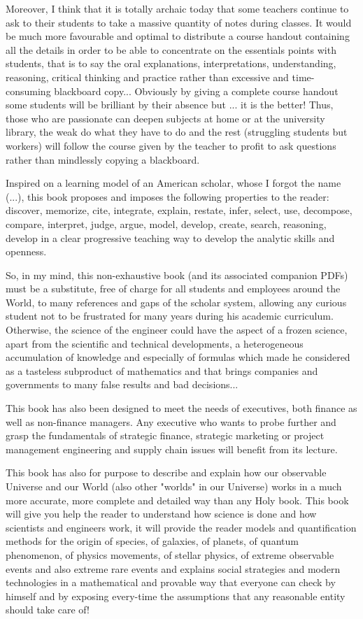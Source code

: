 	Moreover, I think that it is totally archaic today that some teachers continue to ask to their students to take a massive quantity of notes during classes. It would be much more favourable and optimal to distribute a course handout containing all the details in order to be able to concentrate on the essentials points with students, that is to say the oral explanations, interpretations, understanding, reasoning, critical thinking and practice rather than excessive and time-consuming blackboard copy... Obviously by giving a complete course handout some students will be brilliant by their absence but ... it is the better! Thus, those who are passionate can deepen subjects at home or at the university library, the weak do what they have to do and the rest (struggling students but workers) will follow the course given by the teacher to profit to ask questions rather than mindlessly copying a blackboard.

	Inspired on a learning model of an American scholar, whose I forgot the name (...), this book proposes and imposes the following properties to the reader: discover, memorize, cite, integrate, explain, restate, infer, select, use, decompose, compare, interpret, judge, argue, model, develop, create, search, reasoning, develop in a clear progressive teaching way to develop the analytic skills and openness.

	So, in my mind, this non-exhaustive book (and its associated companion PDFs) must be a substitute, free of charge for all students and employees around the World, to many references and gaps of the scholar system, allowing any curious student not to be frustrated for many years during his academic curriculum. Otherwise, the science of the engineer could have the aspect of a frozen science, apart from the scientific and technical developments, a heterogeneous accumulation of knowledge and especially of formulas which made he considered as a tasteless subproduct of mathematics and that brings companies and governments to many false results and bad decisions...
	
	This book has also been designed to meet the needs of executives, both finance as well as non-finance managers. Any executive who wants to probe further and grasp the fundamentals of strategic finance, strategic marketing or project management engineering and supply chain issues will benefit from its lecture. 
	
	This book has also for purpose to describe and explain how our observable Universe and our World (also other "worlds" in our Universe) works in a much more accurate, more complete and detailed way than any Holy book. This book will give you help the reader to understand how science is done and how scientists and engineers work, it will provide the reader models and quantification methods for the origin of species, of galaxies, of planets, of quantum phenomenon, of physics movements, of stellar physics, of extreme observable events and also extreme rare events and explains social strategies and modern technologies in a mathematical and provable way that everyone can check by himself and by exposing every-time the assumptions that any reasonable entity should take care of!
	
